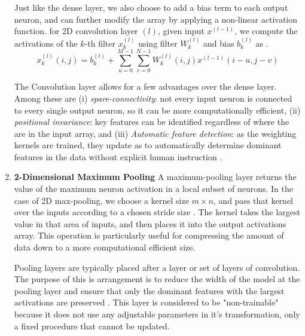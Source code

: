 \documentclass[conference,onecolumn,letterpaper]{IEEEtran}
\begin{document}
\begin{enumerate}
Just like the dense layer, we also choose to add a bias term to each output neuron, and can further modify the array by applying a non-linear activation function. for 2D convolution layer $(l)$, given input $x^{(l-1)}$, we compute the activations of the $k$-th filter $x^{(l)}_k$ using filter $W^{(l)}_k$ and bias $b^{(l)}_k$ as \cite{Goodfellow}.
\begin{equation}
\label{eqn:Conv2DCall}
x^{(l)}_{k}(i,j) = b^{(l)}_{k} + 
\sum_{u=0}^{M-1}\sum_{v=0}^{N-1} W^{(l)}_{k}(i,j) x^{(l-1)}(i-u,j-v)
\end{equation}

The Convolution layer allows for a few advantages over the dense layer. Among these are (i) \textit{spare-connectivity}: not every input neuron is connected to every single output neuron, so it can be more computationally efficient, (ii) \textit{positional invariance}: key features can be identified regardless of where the are in the input array, and (iii) \textit{Automatic feature detection}: as the weighting kernels are trained, they update as to automatically determine dominant features in the data without explicit human instruction \cite{Geron,Goodfellow}.

\item\textbf{2-Dimensional Maximum Pooling}
A maximum-pooling layer returns the value of the maximum neuron activation in a local subset of neurons. In the case of 2D max-pooling, we choose a kernel size $m \times n$, and pass that kernel over the inputs according to a chosen stride size \cite{Tensorflow}. The kernel takes the largest value in that area of inputs, and then places it into the output activations array. This operation is particularly useful for compressing the amount of data down to a more computational efficient size.

Pooling layers are typically placed after a layer or set of layers of convolution. The purpose of this is arrangement is to reduce the width of the model at the pooling layer and ensure that only the dominant features with the largest activations are preserved \cite{Geron}. This layer is considered to be "non-trainable" because it does not use any adjustable parameters in it's transformation, only a fixed procedure that cannot be updated.


\end{enumerate}
\end{document}

